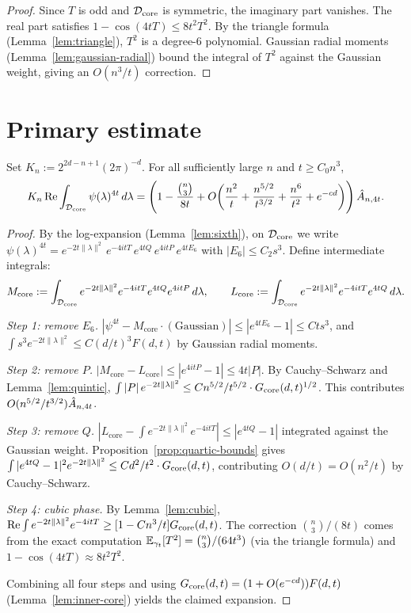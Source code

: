 \begin{proof}\leanok
{}
Since $T$ is odd and $\mathcal{D}_\mathrm{core}$ is symmetric, the imaginary part vanishes.
The real part satisfies $1-\cos(4tT)\le 8t^2 T^2$. By the triangle formula
(Lemma~\ref{lem:triangle}), $T^2$ is a degree-6 polynomial. Gaussian
radial moments (Lemma~\ref{lem:gaussian-radial}) bound the integral of
$T^2$ against the Gaussian weight, giving an $O(n^3/t)$ correction.
\end{proof}

\section{Primary estimate}

\begin{proposition}\label{prop:primary-box}
\leanok
{}
Set $K_n:=2^{2d-n+1}(2\pi)^{-d}$.
For all sufficiently large $n$ and $t\ge C_0 n^3$,
\[
  K_n\operatorname{Re}\int_{\mathcal{D}_\mathrm{core}}\psi(\lambda)^{4t}\,d\lambda
  =\left(1-\frac{\binom{n}{3}}{8t}
  +O\!\left(\frac{n^2}{t}+\frac{n^{5/2}}{t^{3/2}}+\frac{n^6}{t^2}
  +e^{-cd}\right)\right)\hat A_{n,4t}.
\]
\end{proposition}

\begin{proof}\leanok
{}
By the log-expansion (Lemma~\ref{lem:sixth}), on $\mathcal{D}_\mathrm{core}$ we write
$\psi(\lambda)^{4t}=e^{-2t\|\lambda\|^2}\,e^{-4itT}\,e^{4tQ}\,e^{4itP}\,e^{4tE_6}$
with $|E_6|\le C_2 s^3$.
Define intermediate integrals:
\[
  M_{\mathrm{core}}:=\int_{\mathcal{D}_\mathrm{core}}e^{-2t\|\lambda\|^2}e^{-4itT}e^{4tQ}e^{4itP}\,d\lambda,
  \qquad
  L_{\mathrm{core}}:=\int_{\mathcal{D}_\mathrm{core}}e^{-2t\|\lambda\|^2}e^{-4itT}e^{4tQ}\,d\lambda.
\]

\emph{Step 1: remove $E_6$.}
$|\psi^{4t}-M_{\mathrm{core}}\cdot(\text{Gaussian})|\le |e^{4tE_6}-1|\le C t s^3$,
and $\int s^3 e^{-2t\|\lambda\|^2}\le C(d/t)^3 F(d,t)$
by Gaussian radial moments.

\emph{Step 2: remove $P$.}
$|M_{\mathrm{core}}-L_{\mathrm{core}}|\le |e^{4itP}-1|\le 4t|P|$.
By Cauchy--Schwarz and Lemma~\ref{lem:quintic},
$\int |P|\,e^{-2t\|\lambda\|^2}\le C n^{5/2}/t^{5/2}\cdot G_{\mathrm{core}}(d,t)^{1/2}$.
This contributes $O(n^{5/2}/t^{3/2})\hat A_{n,4t}$.

\emph{Step 3: remove $Q$.}
$|L_{\mathrm{core}}-\int e^{-2t\|\lambda\|^2}e^{-4itT}|\le
|e^{4tQ}-1|$ integrated against the Gaussian weight.
Proposition~\ref{prop:quartic-bounds} gives
$\int |e^{4tQ}-1|^2 e^{-2t\|\lambda\|^2}\le C d^2/t^2\cdot G_{\mathrm{core}}(d,t)$,
contributing $O(d/t)=O(n^2/t)$ by Cauchy--Schwarz.

\emph{Step 4: cubic phase.}
By Lemma~\ref{lem:cubic},
$\operatorname{Re}\int e^{-2t\|\lambda\|^2}e^{-4itT}\ge [1-Cn^3/t]G_{\mathrm{core}}(d,t)$.
The correction $\binom{n}{3}/(8t)$ comes from the exact computation
$\mathbb{E}_{\gamma_t}[T^2]=\binom{n}{3}/(64t^3)$ (via the triangle formula)
and $1-\cos(4tT)\approx 8t^2T^2$.

Combining all four steps and using $G_{\mathrm{core}}(d,t)=(1+O(e^{-cd}))F(d,t)$
(Lemma~\ref{lem:inner-core}) yields the claimed expansion.
\end{proof}

